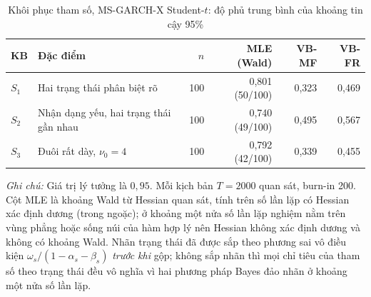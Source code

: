 \begin{table}[H]
\centering\footnotesize
\caption{Khôi phục tham số, MS-GARCH-X Student-$t$: độ phủ trung bình của khoảng tin cậy 95\%}
\label{tab:pra-coverage}
\begin{tabular}{llrrrr}
\toprule
\textbf{KB} & \textbf{Đặc điểm} & $n$ & MLE (Wald) & VB-MF & VB-FR \\
\midrule
$S_{1}$ & Hai trạng thái phân biệt rõ & 100 & 0,801 (50/100) & 0,323 & 0,469 \\
$S_{2}$ & Nhận dạng yếu, hai trạng thái gần nhau & 100 & 0,740 (49/100) & 0,495 & 0,567 \\
$S_{3}$ & Đuôi rất dày, $\nu_0 = 4$ & 100 & 0,792 (42/100) & 0,339 & 0,455 \\
\bottomrule
\end{tabular}
\vspace{0.3em}
\raggedright\scriptsize
\emph{Ghi chú:} Giá trị lý tưởng là $0{,}95$. Mỗi kịch bản $T = 2000$ quan sát, burn-in 200. Cột MLE là khoảng Wald từ Hessian quan sát, tính trên số lần lặp có Hessian xác định dương (trong ngoặc); ở khoảng một nửa số lần lặp nghiệm nằm trên vùng phẳng hoặc sống núi của hàm hợp lý nên Hessian không xác định dương và không có khoảng Wald. Nhãn trạng thái đã được sắp theo phương sai vô điều kiện $\omega_s/(1-\alpha_s-\beta_s)$ \emph{trước khi} gộp; không sắp nhãn thì mọi chỉ tiêu của tham số theo trạng thái đều vô nghĩa vì hai phương pháp Bayes đảo nhãn ở khoảng một nửa số lần lặp.
\end{table}

